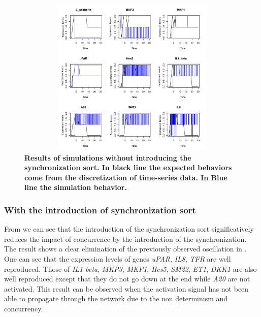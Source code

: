 \begin{figure}[!t]
\centering
\includegraphics[width=5in,height=3in]{images/resultWOS.pdf}
\caption{\bf Results of simulations without introducing the synchronization sort. In black line the expected behaviors
come from the discretization of time-series data. In Blue line the simulation behavior.}
\label{fig:rwos}
\end{figure}
\subsubsection{With the introduction of synchronization sort}

From  we can see that the introduction of the synchronization sort significatively reduces the 
impact of concurrence by the introduction of the synchronization. The result shows  a 
clear elimination of the previously observed oscillation in . One can see that the expression levels of genes \emph{uPAR}, \emph{IL8}, \emph{TFR} are well reproduced. Those of \emph{IL1 beta}, \emph{MKP3}, \emph{MKP1}, \emph{Hes5}, \emph{SM22}, \emph{ET1}, \emph{DKK1} are also well reproduced except that they do not go down at the end while \emph{A20} are not activated. This result can be observed when the activation
signal has not been able to propagate through the network due to the non determinism  and concurrency.


